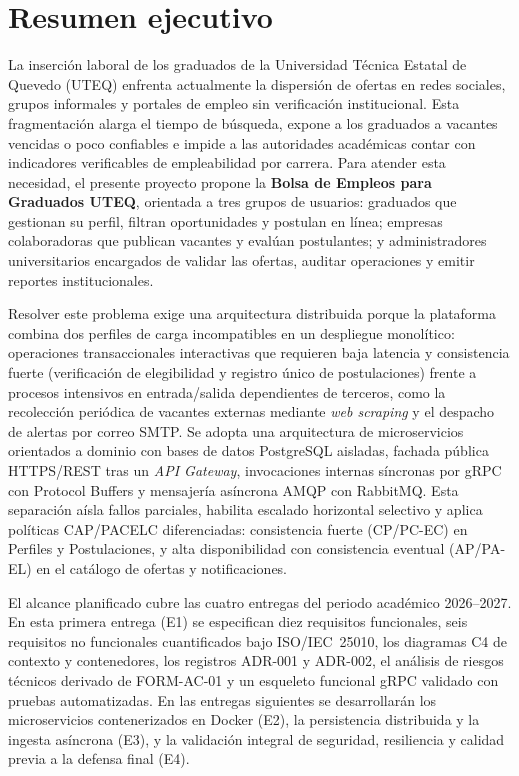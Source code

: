\documentclass[11pt,a4paper]{article}
\begin{document}
\tableofcontents
\newpage

\section{Resumen ejecutivo}

La inserción laboral de los graduados de la Universidad Técnica Estatal de Quevedo (UTEQ) enfrenta actualmente la dispersión de ofertas en redes sociales, grupos informales y portales de empleo sin verificación institucional. Esta fragmentación alarga el tiempo de búsqueda, expone a los graduados a vacantes vencidas o poco confiables e impide a las autoridades académicas contar con indicadores verificables de empleabilidad por carrera. Para atender esta necesidad, el presente proyecto propone la \textbf{Bolsa de Empleos para Graduados UTEQ}, orientada a tres grupos de usuarios: graduados que gestionan su perfil, filtran oportunidades y postulan en línea; empresas colaboradoras que publican vacantes y evalúan postulantes; y administradores universitarios encargados de validar las ofertas, auditar operaciones y emitir reportes institucionales.

Resolver este problema exige una arquitectura distribuida porque la plataforma combina dos perfiles de carga incompatibles en un despliegue monolítico: operaciones transaccionales interactivas que requieren baja latencia y consistencia fuerte (verificación de elegibilidad y registro único de postulaciones) frente a procesos intensivos en entrada/salida dependientes de terceros, como la recolección periódica de vacantes externas mediante \textit{web scraping} y el despacho de alertas por correo SMTP. Se adopta una arquitectura de microservicios orientados a dominio con bases de datos PostgreSQL aisladas, fachada pública HTTPS/REST tras un \textit{API Gateway}, invocaciones internas síncronas por gRPC con Protocol Buffers y mensajería asíncrona AMQP con RabbitMQ. Esta separación aísla fallos parciales, habilita escalado horizontal selectivo y aplica políticas CAP/PACELC diferenciadas: consistencia fuerte (CP/PC-EC) en Perfiles y Postulaciones, y alta disponibilidad con consistencia eventual (AP/PA-EL) en el catálogo de ofertas y notificaciones.

El alcance planificado cubre las cuatro entregas del periodo académico 2026--2027. En esta primera entrega (E1) se especifican diez requisitos funcionales, seis requisitos no funcionales cuantificados bajo ISO/IEC~25010, los diagramas C4 de contexto y contenedores, los registros ADR-001 y ADR-002, el análisis de riesgos técnicos derivado de FORM-AC-01 y un esqueleto funcional gRPC validado con pruebas automatizadas. En las entregas siguientes se desarrollarán los microservicios contenerizados en Docker (E2), la persistencia distribuida y la ingesta asíncrona (E3), y la validación integral de seguridad, resiliencia y calidad previa a la defensa final (E4).
\end{document}
